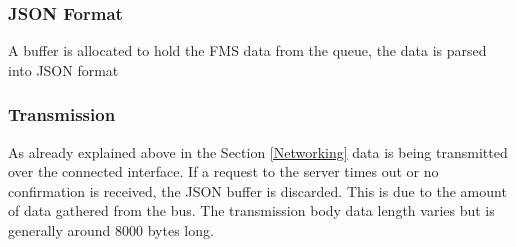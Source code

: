 \subsubsection{JSON Format}
A buffer is allocated to hold the FMS data from the queue, the data is parsed into JSON format

\begin{table}[h!]
    \begin{center}
    \end{center}
\caption{\label{fig:frame-configuration-example}Frame Filter Configuration Example}
\end{table}
\newpage

\subsubsection{Transmission}
As already explained above in the Section \ref{Networking} data is being transmitted over the connected interface. If a request to the server times out or no confirmation is received, the JSON buffer is discarded. This is due to the amount of data gathered from the bus. The transmission body data length varies but is generally around 8000 bytes long.

